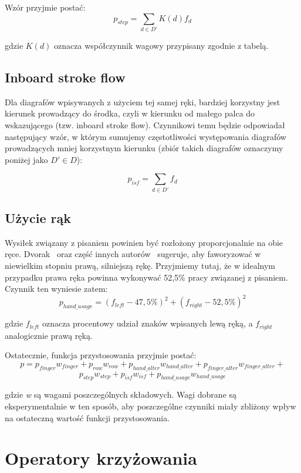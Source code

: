 \documentclass[brudnopis]{xmgr}
\begin{document}
Wzór przyjmie postać:
$$ p_{step} = \sum\limits_{d \in D'} K(d) f_d $$

gdzie $K(d)$ oznacza współczynnik wagowy przypisany zgodnie z tabelą.


\subsection{Inboard stroke flow}

Dla diagrafów wpisywanych z użyciem tej samej ręki, bardziej korzystny jest kierunek prowadzący do środka, czyli w kierunku od małego palca do wskazującego (tzw. inboard stroke flow). Czynnikowi temu będzie odpowiadał następujący wzór, w którym sumujemy częstotliwości występowania diagrafów prowadzących mniej korzystnym kierunku (zbiór takich diagrafów oznaczymy poniżej jako $ D' \in D $):

$$ p_{isf} = \sum\limits_{d \in D'} f_d $$


\subsection{Użycie rąk}

Wysiłek związany z pisaniem powinien być rozłożony proporcjonalnie na obie ręce. Dvorak~\cite{cassingham1986dvorak} oraz część innych autorów~\cite{Call:2005:CME} sugeruje, aby faworyzować w niewielkim stopniu prawą, silniejszą rękę. Przyjmiemy tutaj, że w idealnym przypadku prawa ręka powinna wykonywać 52,5\% pracy związanej z pisaniem. Czynnik ten wyniesie zatem:
$$ p_{hand\_usage} = (f_{left} - 47,5\%)^2 + (f_{right} - 52,5\%)^2 $$

gdzie $f_{left}$ oznacza procentowy udział znaków wpisanych lewą ręką, a $f_{right}$ analogicznie prawą ręką.\newline\newline


\noindent Ostatecznie, funkcja przystosowania przyjmie postać:
$$ p = p_{finger} w_{finger} + p_{row} w_{row} + p_{hand\_alter} w_{hand\_alter} + p_{finger\_alter} w_{finger\_alter} + $$
$$ p_{step} w_{step} + p_{isf} w_{isf} + p_{hand\_usage} w_{hand\_usage} $$

\noindent
gdzie \emph{w} są wagami poszczególnych składowych. Wagi dobrane są eksperymentalnie w ten sposób, aby poszczególne czynniki miały zbliżony wpływ na ostateczną wartość funkcji przystosowania.


\section{Operatory krzyżowania}
\end{document}
